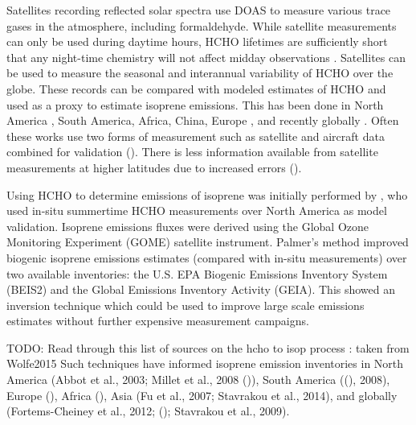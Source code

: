     Satellites recording reflected solar spectra use DOAS to measure various trace gases in the atmosphere, including formaldehyde. 
    While satellite measurements can only be used during daytime hours, HCHO lifetimes are sufficiently short that any night-time chemistry will not affect midday observations \citep{Wolfe2016}.
    Satellites can be used to measure the seasonal and interannual variability of HCHO over the globe.
    These records can be compared with modeled estimates of HCHO and used as a proxy to estimate isoprene emissions.
    This has been done in North America \citep{Palmer2003, Millet2006}, South America, Africa, China, Europe \citep{Dufour2009}, and recently globally \citep{FortemsCheiney2012, Bauwens2016}.
    Often these works use two forms of measurement such as satellite and aircraft data combined for validation (\cite{Marais2014}).
    There is less information available from satellite measurements at higher latitudes due to increased errors (\cite{DeSmedt2015}).
    
    Using HCHO to determine emissions of isoprene was initially performed by \cite{Palmer2001, Palmer2003}, who used in-situ summertime HCHO measurements over North America as model validation.
    Isoprene emissions fluxes were derived using the Global Ozone Monitoring Experiment (GOME) satellite instrument.
    Palmer's method improved biogenic isoprene emissions estimates (compared with in-situ measurements) over two available inventories: the U.S. EPA Biogenic Emissions Inventory System (BEIS2) and the Global Emissions Inventory Activity (GEIA).
    This showed an inversion technique which could be used to improve large scale emissions estimates without further expensive measurement campaigns.
    
    TODO: Read through this list of sources on the hcho to isop process : taken from Wolfe2015
    Such techniques have informed isoprene emission inventories in North America (Abbot et al., 2003; Millet et al., 2008 (\cite{Palmer2003,Millet2006,Palmer2006})), South America ((\cite{Barkley2013}), 2008), Europe (\cite{Curci2010,Dufour2009}), Africa (\cite{Marais2012}), Asia (Fu et al., 2007; Stavrakou et al., 2014), and globally (Fortems-Cheiney et al., 2012; (\cite{Shim2005}); Stavrakou et al., 2009).
    

